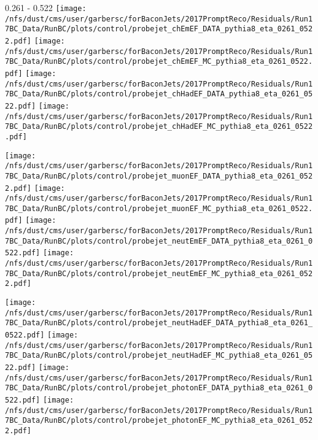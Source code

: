 \documentclass[t,compress]{beamer}
\begin{document}
\begin{frame}{0.261 - 0.522}
	\texttt{[image: /nfs/dust/cms/user/garbersc/forBaconJets/2017PromptReco/Residuals/Run17BC\_Data/RunBC/plots/control/probejet\_chEmEF\_DATA\_pythia8\_eta\_0261\_0522.pdf]}
	\texttt{[image: /nfs/dust/cms/user/garbersc/forBaconJets/2017PromptReco/Residuals/Run17BC\_Data/RunBC/plots/control/probejet\_chEmEF\_MC\_pythia8\_eta\_0261\_0522.pdf]}
	\texttt{[image: /nfs/dust/cms/user/garbersc/forBaconJets/2017PromptReco/Residuals/Run17BC\_Data/RunBC/plots/control/probejet\_chHadEF\_DATA\_pythia8\_eta\_0261\_0522.pdf]}
	\texttt{[image: /nfs/dust/cms/user/garbersc/forBaconJets/2017PromptReco/Residuals/Run17BC\_Data/RunBC/plots/control/probejet\_chHadEF\_MC\_pythia8\_eta\_0261\_0522.pdf]}
\newline

\vspace{-0.65cm}
	\texttt{[image: /nfs/dust/cms/user/garbersc/forBaconJets/2017PromptReco/Residuals/Run17BC\_Data/RunBC/plots/control/probejet\_muonEF\_DATA\_pythia8\_eta\_0261\_0522.pdf]}
	\texttt{[image: /nfs/dust/cms/user/garbersc/forBaconJets/2017PromptReco/Residuals/Run17BC\_Data/RunBC/plots/control/probejet\_muonEF\_MC\_pythia8\_eta\_0261\_0522.pdf]}
	\texttt{[image: /nfs/dust/cms/user/garbersc/forBaconJets/2017PromptReco/Residuals/Run17BC\_Data/RunBC/plots/control/probejet\_neutEmEF\_DATA\_pythia8\_eta\_0261\_0522.pdf]}
	\texttt{[image: /nfs/dust/cms/user/garbersc/forBaconJets/2017PromptReco/Residuals/Run17BC\_Data/RunBC/plots/control/probejet\_neutEmEF\_MC\_pythia8\_eta\_0261\_0522.pdf]}
\newline

\vspace{-0.65cm}
	\texttt{[image: /nfs/dust/cms/user/garbersc/forBaconJets/2017PromptReco/Residuals/Run17BC\_Data/RunBC/plots/control/probejet\_neutHadEF\_DATA\_pythia8\_eta\_0261\_0522.pdf]}
	\texttt{[image: /nfs/dust/cms/user/garbersc/forBaconJets/2017PromptReco/Residuals/Run17BC\_Data/RunBC/plots/control/probejet\_neutHadEF\_MC\_pythia8\_eta\_0261\_0522.pdf]}
	\texttt{[image: /nfs/dust/cms/user/garbersc/forBaconJets/2017PromptReco/Residuals/Run17BC\_Data/RunBC/plots/control/probejet\_photonEF\_DATA\_pythia8\_eta\_0261\_0522.pdf]}
	\texttt{[image: /nfs/dust/cms/user/garbersc/forBaconJets/2017PromptReco/Residuals/Run17BC\_Data/RunBC/plots/control/probejet\_photonEF\_MC\_pythia8\_eta\_0261\_0522.pdf]}
\end{frame}
\end{document}
